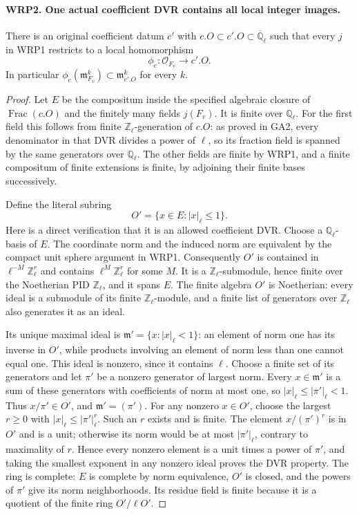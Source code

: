 \paragraph{WRP2. One actual coefficient DVR contains all local integer images.}
\label{claim:WRP2}
There is an original coefficient datum $c'$ with
$c.O\subset c'.O\subset\overline{\mathbb Q}_\ell$ such that
every $j$ in WRP1 restricts to a local homomorphism
\[
               \phi_e:\mathcal O_{F_v}\longrightarrow c'.O.
\]
In particular $\phi_e(\mathfrak m_{F_v}^k)
\subset\mathfrak m_{c'.O}^k$ for every $k$.
\begin{proof}
Let $E$ be the compositum inside the specified algebraic closure
of $\operatorname{Frac}(c.O)$ and the finitely many fields
$j(F_v)$.  It is finite over $\mathbb Q_\ell$.  For the first
field this follows from finite $\mathbb Z_\ell$-generation of
$c.O$: as proved in GA2, every denominator in that DVR divides
a power of $\ell$, so its fraction field is spanned by the
same generators over $\mathbb Q_\ell$.  The other fields are
finite by WRP1, and a finite compositum of finite extensions
is finite, by adjoining their finite bases successively.

Define the literal subring
\[
                       O'=\{x\in E:|x|_\ell\leq1\}.
\]
Here is a direct verification that it is an allowed coefficient
DVR.  Choose a $\mathbb Q_\ell$-basis of $E$.  The coordinate
norm and the induced norm are equivalent by the compact unit
sphere argument in WRP1.  Consequently $O'$ is contained
in $\ell^{-M}\mathbb Z_\ell^r$ and contains
$\ell^M\mathbb Z_\ell^r$ for some $M$.  It is a
$\mathbb Z_\ell$-submodule, hence finite over the Noetherian
PID $\mathbb Z_\ell$, and it spans $E$.  The finite algebra
$O'$ is Noetherian: every ideal is a submodule of its finite
$\mathbb Z_\ell$-module, and a finite list of generators
over $\mathbb Z_\ell$ also generates it as an ideal.

Its unique maximal ideal is
$\mathfrak m' =\{x:|x|_\ell<1\}$: an element of norm one
has its inverse in $O'$, while products involving an element
of norm less than one cannot equal one.  This ideal is
nonzero, since it contains $\ell$.  Choose a finite set of
its generators and let $\pi'$ be a nonzero generator of
largest norm.  Every $x\in\mathfrak m'$ is a sum of these
generators with coefficients of norm at most one, so
$|x|_\ell\leq|\pi'|_\ell<1$.  Thus $x/\pi'\in O'$,
and $\mathfrak m'=(\pi')$.  For any nonzero $x\in O'$,
choose the largest $r\geq0$ with
$|x|_\ell\leq|\pi'|_\ell^r$.  Such an $r$ exists and is
finite.  The element $x/(\pi')^r$ is in $O'$ and is a unit;
otherwise its norm would be at most $|\pi'|_\ell$, contrary
to maximality of $r$.  Hence every nonzero element is a unit
times a power of $\pi'$, and taking the smallest exponent
in any nonzero ideal proves the DVR property.  The ring is
complete: $E$ is complete by norm equivalence, $O'$ is
closed, and the powers of $\pi'$ give its norm neighborhoods.
Its residue field is finite because it is a quotient of the
finite ring $O'/\ell O'$.


\end{proof}
